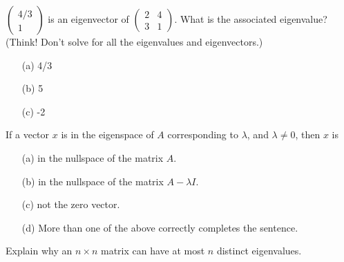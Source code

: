 \begin{problem}
    $\left( \begin{array}{c} 4/3 \\ 1 \end{array} \right)$ is an eigenvector of $\left(
    \begin{array}{cc} 2 & 4 \\ 3 & 1 \end{array} \right).$ What is the associated
    eigenvalue? (Think! Don't solve for all the eigenvalues and eigenvectors.)

\begin{enumerate}
    \item[(a)] 4/3
\item[(b)] 5
\item[(c)] -2
\end{enumerate}
\end{problem}
%             


\begin{problem}
    If a vector $x$ is in the eigenspace of $A$ corresponding to $\lambda$, and $\lambda
    \neq 0$, then $x$ is

\begin{enumerate}
    \item[(a)] in the nullspace of the matrix $A.$
    \item[(b)] in the nullspace of the matrix $A - \lambda I.$
    \item[(c)] not the zero vector.
    \item[(d)] More than one of the above correctly completes the sentence.
\end{enumerate}
\end{problem}
%             

\begin{problem}
    Explain why an $n \times n$ matrix can have at most $n$ distinct eigenvalues.
\end{problem}

